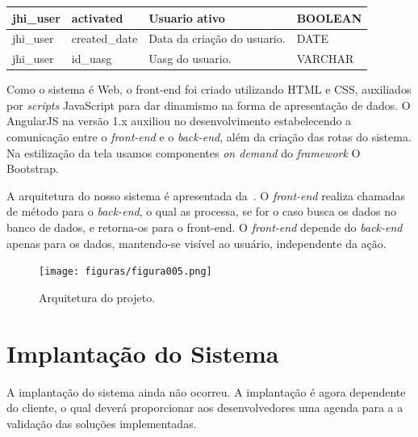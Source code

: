 \begin{landscape}
\begin{table}[ht]
\begin{tabular}{|l|l|l|l|}
			jhi\_user      & activated                 & Usuario ativo                                                          & BOOLEAN      \\ \hline
			jhi\_user      & created\_date             & Data da criação do usuario.                                            & DATE         \\ \hline
			jhi\_user      & id\_uasg                  & Uasg do usuario.                                                       & VARCHAR      \\ \hline
		\end{tabular}
		
	\end{table}
\end{landscape}

Como o sistema é Web, o front-end foi criado utilizando  HTML e CSS, auxiliados por \textit{scripts} JavaScript para dar dinamismo na forma de apresentação de dados.
O AngularJS na versão 1.x auxiliou no desenvolvimento estabelecendo a comunicação entre o \textit{front-end} e o \textit{back-end}, além da criação das rotas do sistema.
Na estilização da tela usamos componentes \textit{on demand} do \textit{framework} O Bootstrap.

A arquitetura do nosso sistema é apresentada da~.
O \textit{front-end} realiza chamadas de método para o \textit{back-end}, o qual as processa, se for o caso busca os dados no banco de dados, e retorna-os para o front-end.
O \textit{front-end} depende do \textit{back-end} apenas para os dados, mantendo-se visível ao usuário, independente da ação.

\begin{figure}
    \centering
    \texttt{[image: figuras/figura005.png]}
    \caption{Arquitetura do projeto.}
    \label{Figura005}
\end{figure}

\section{Implantação do Sistema}

A implantação do sistema ainda não ocorreu.
A implantação é agora dependente do cliente, o qual deverá proporcionar aos desenvolvedores uma agenda para a a validação das soluções implementadas.